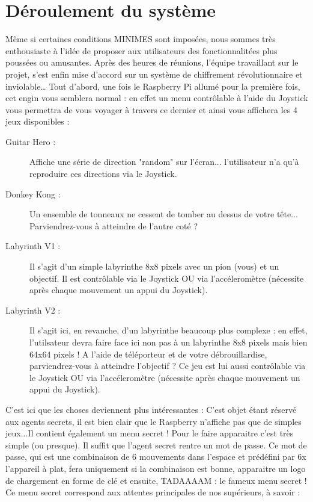 \section{Déroulement du système}
Même si certaines conditions MINIMES sont imposées, nous sommes très enthousiaste à l'idée de proposer aux utilisateurs des fonctionnalitées plus poussées ou amusantes. Après des heures de réunions, l’équipe travaillant sur le projet, s’est enfin mise d’accord sur un système de chiffrement révolutionnaire et inviolable…
\newline\newline
Tout d'abord, une fois le Raspberry Pi allumé pour la première fois, cet engin vous semblera normal : en effet un menu contrôlable à l'aide du Joystick vous permettra de vous voyager à travers ce dernier et ainsi vous affichera les 4 jeux disponibles :
\begin{description}
    \item [Guitar Hero :] Affiche une série de direction "random" sur l'écran... l'utilisateur n'a qu'à reproduire ces directions via le Joystick.
    \item [Donkey Kong :] Un ensemble de tonneaux ne cessent de tomber au dessus de votre tête... Parviendrez-vous à atteindre de l'autre coté ?
    \item [Labyrinth V1 :] Il s'agit d'un simple labyrinthe 8x8 pixels avec un pion (vous) et un objectif. Il est contrôlable via le Joystick OU via l'accéleromètre (nécessite après chaque mouvement un appui du Joystick).
    \item [Labyrinth V2 :] Il s'agit ici, en revanche, d'un labyrinthe beaucoup plus complexe : en effet, l'utilsateur devra faire face ici non pas à un labyrinthe 8x8 pixels mais bien 64x64 pixels ! A l'aide de téléporteur et de votre débrouillardise, parviendrez-vous à atteindre l'objectif ? Ce jeu est lui aussi contrôlable via le Joystick OU via l'accéleromètre (nécessite après chaque mouvement un appui du Joystick).
\end{description}
\newpage
C'est ici que les choses deviennent plus intéressantes : C'est objet étant réservé aux agents secrets, il est bien clair que le Raspberry n'affiche pas que de simples jeux...Il contient également un menu secret ! Pour le faire apparaitre c'est très simple (ou presque). Il suffit que l'agent secret rentre un mot de passe. Ce mot de passe, qui est une combinaison de 6 mouvements dans l'espace et prédéfini par 6x l'appareil à plat, fera uniquement si la combinaison est bonne, apparaitre un logo de chargement en forme de clé et ensuite, TADAAAAM : le fameux menu secret ! Ce menu secret correspond aux attentes principales de nos supérieurs, à savoir :
